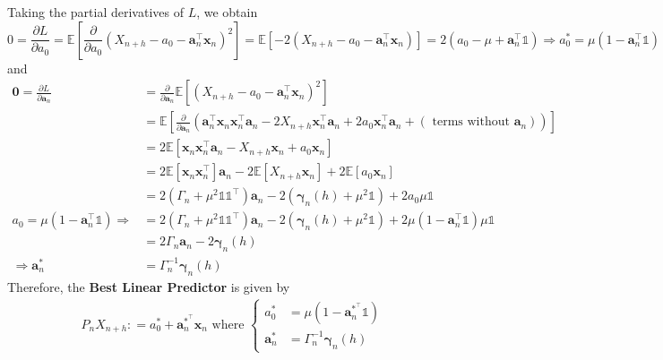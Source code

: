 \documentclass[11pt]{article}
\theoremstyle{plain} %
\theoremstyle{remark}
\newcommand{\bOne}{\mathds{1}}
\newcommand{\EE}{\mathbb{E}}
\begin{document}
Taking the partial derivatives of $L$, we obtain
$$
  0 = \frac{\partial L}{\partial a_0}
  = \EE\left[\frac{\partial }{\partial a_0}(X_{n+h}-a_0-\mathbf{a}_n^\top \mathbf{x}_n)^2\right]
  = \EE\left[-2(X_{n+h}-a_0-\mathbf{a}_n^\top \mathbf{x}_n)\right] = 2(a_0-\mu+\mathbf{a}_n^\top\bOne)
  \Longrightarrow a_0^* = \mu(1-\mathbf{a}_n^\top\bOne)
$$
and
\begin{align*}
  \bm{0} = \frac{\partial L}{\partial \mathbf{a}_n} & = \frac{\partial }{\partial \mathbf{a}_n}\EE\left[(X_{n+h} - a_0 - \mathbf{a}_n^\top \mathbf{x}_n)^2\right]                                                                         \\
                                                    & =\EE\left[\frac{\partial }{\partial \mathbf{a}_n}\left(\mathbf{a}_n^\top\mathbf{x}_n \mathbf{x}_n^\top\mathbf{a}_n - 2X_{n+h}\mathbf{x}_n^\top \mathbf{a}_n + 2a_0\mathbf{x}_n^\top
  \mathbf{a}_n + (\text{ terms without } \mathbf{a}_n)\right)\right]                                                                                                                                                                      \\
                                                    & =2 \EE[\mathbf{x}_n \mathbf{x}_n^\top\mathbf{a}_n - X_{n+h}\mathbf{x}_n + a_0\mathbf{x}_n]                                                                                          \\
                                                    & =2 \EE[\mathbf{x}_n \mathbf{x}_n^\top]\mathbf{a}_n - 2\EE[X_{n+h}\mathbf{x}_n] + 2\EE[a_0\mathbf{x}_n]                                                                              \\
                                                    & =2 (\Gamma_n +\mu^2 \bOne\bOne^\top)\mathbf{a}_n - 2(\bm{\gamma}_n(h) + \mu^2 \bOne) + 2a_0\mu \bOne                                                                                \\
  a_0 = \mu(1-\mathbf{a}_n^\top\bOne) \Longrightarrow
                                                    & =2 (\Gamma_n +\mu^2 \bOne\bOne^\top)\mathbf{a}_n - 2(\bm{\gamma}_n(h) + \mu^2 \bOne) + 2 \mu(1-\mathbf{a}_n^\top\bOne)\mu \bOne                                                     \\
                                                    & =2 \Gamma_n \mathbf{a}_n - 2\bm{\gamma}_n(h)                                                                                                                                        \\
  \Longrightarrow \mathbf{a}_n^*                    &
  = \Gamma_n^{-1}\bm{\gamma}_n(h)
\end{align*}
Therefore, the \textbf{Best Linear Predictor} is given by
\begin{align}
  P_n X_{n+h} : = a_0^* + \mathbf{a}_n^{*^\top} \mathbf{x}_n \text{ where }
  \begin{cases}
    a_0^*          & = \mu(1-\mathbf{a}_n^{*^\top}\bOne) \\
    \mathbf{a}_n^* & = \Gamma_n^{-1}\bm{\gamma}_n(h)
  \end{cases} \label{eq: Best Linear Predictor}
\end{align}
\end{document}

